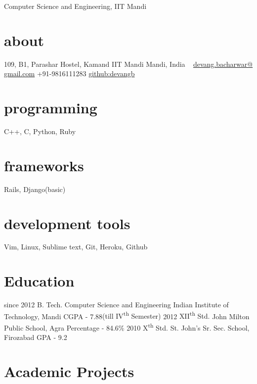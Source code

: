 \documentclass[]{friggeri-cv}
\begin{document}
       {Computer Science and Engineering, IIT Mandi}


\begin{aside}
  \section{about}
    109, B1, Parashar Hostel, Kamand
    IIT Mandi
    Mandi, India
    ~
    \href{mailto:devang.bacharwar@gmail.com}{devang.bacharwar@ gmail.com}
    {+91-9816111283}
    \href{https://github.com/devangb}{github:devangb}
  \section{programming}
    C++, C, Python, Ruby
  \section{frameworks}
  	Rails, Django(basic)
  \section{development tools}
  	Vim, Linux, Sublime text, Git, Heroku, Github 
\end{aside}


\section{Education}

\begin{entrylist}
  \entry
    {since 2012}
    {B. Tech. {\normalfont Computer Science and Engineering}}
    {Indian Institute of Technology, Mandi}
    {CGPA - 7.88{\small (till IV\textsuperscript{th} Semester)}}
  \entry
    {2012}
    {XII\textsuperscript{th} Std.}
    {John Milton Public School, Agra}
    {Percentage - 84.6\%}
  \entry
    {2010}
    {X\textsuperscript{th} Std.}
    {St. John's Sr. Sec. School, Firozabad}
    {GPA - 9.2}
\end{entrylist}

\section{Academic Projects}
\end{document}

